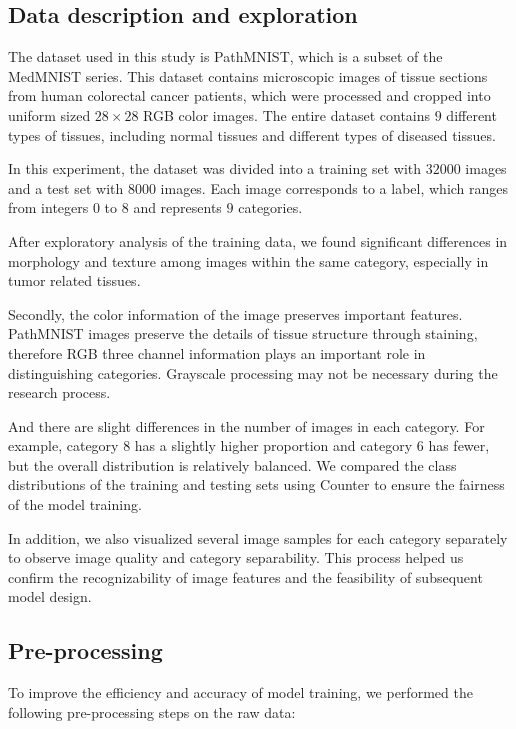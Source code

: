 \subsection{Data description and exploration}

\noindent 

The dataset used in this study is PathMNIST, which is a subset of the MedMNIST series. This dataset contains microscopic images of tissue sections from human colorectal cancer patients, which were processed and cropped into uniform sized $28\times28$ RGB color images. The entire dataset contains $9$ different types of tissues, including normal tissues and different types of diseased tissues.

In this experiment, the dataset was divided into a training set with $32000$ images and a test set with $8000$ images. Each image corresponds to a label, which ranges from integers $0$ to $8$ and represents $9$ categories. 

After exploratory analysis of the training data, we found significant differences in morphology and texture among images within the same category, especially in tumor related tissues.

Secondly, the color information of the image preserves important features. PathMNIST images preserve the details of tissue structure through staining, therefore RGB three channel information plays an important role in distinguishing categories. Grayscale processing may not be necessary during the research process.

And there are slight differences in the number of images in each category. For example, category $8$ has a slightly higher proportion and category $6$ has fewer, but the overall distribution is relatively balanced. We compared the class distributions of the training and testing sets using Counter to ensure the fairness of the model training.

In addition, we also visualized several image samples for each category separately to observe image quality and category separability. This process helped us confirm the recognizability of image features and the feasibility of subsequent model design.

\subsection{Pre-processing}

\indent 

To improve the efficiency and accuracy of model training, we performed the following pre-processing steps on the raw data:

